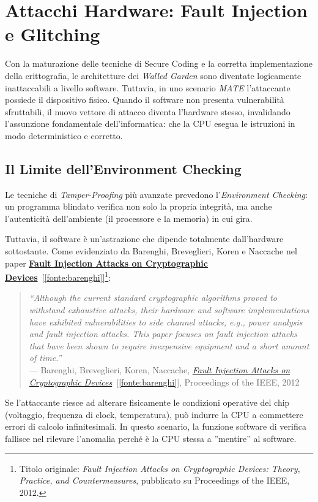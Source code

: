 \section{Attacchi Hardware: Fault Injection e Glitching}

Con la maturazione delle tecniche di Secure Coding e la corretta implementazione della crittografia, le architetture dei \textit{Walled Garden} sono diventate logicamente inattaccabili a livello software. Tuttavia, in uno scenario \textit{MATE} l'attaccante possiede il dispositivo fisico. Quando il software non presenta vulnerabilità sfruttabili, il nuovo vettore di attacco diventa l'hardware stesso, invalidando l'assunzione fondamentale dell'informatica: che la CPU esegua le istruzioni in modo deterministico e corretto.

\subsection{Il Limite dell'Environment Checking}

Le tecniche di \textit{Tamper-Proofing} più avanzate prevedono l'\textit{Environment Checking}: un programma blindato verifica non solo la propria integrità, ma anche l'autenticità dell'ambiente (il processore e la memoria) in cui gira.

Tuttavia, il software è un'astrazione che dipende totalmente dall'hardware sottostante. Come evidenziato da Barenghi, Breveglieri, Koren e Naccache nel paper \hyperref[fonte:barenghi]{\textbf{Fault Injection Attacks on Cryptographic Devices}}~[\ref{fonte:barenghi}]\footnote{Titolo originale: \textit{Fault Injection Attacks on Cryptographic Devices: Theory, Practice, and Countermeasures}, pubblicato su Proceedings of the IEEE, 2012.}:

\begin{quote}
    \textit{``Although the current standard cryptographic algorithms proved to withstand exhaustive attacks, their hardware and software implementations have exhibited vulnerabilities to side channel attacks, e.g., power analysis and fault injection attacks. This paper focuses on fault injection attacks that have been shown to require inexpensive equipment and a short amount of time.''}\\
    --- Barenghi, Breveglieri, Koren, Naccache, \hyperref[fonte:barenghi]{\textit{Fault Injection Attacks on Cryptographic Devices}}~[\ref{fonte:barenghi}], Proceedings of the IEEE, 2012
\end{quote}

Se l'attaccante riesce ad alterare fisicamente le condizioni operative del chip (voltaggio, frequenza di clock, temperatura), può indurre la CPU a commettere errori di calcolo infinitesimali. In questo scenario, la funzione software di verifica fallisce nel rilevare l'anomalia perché è la CPU stessa a ''mentire'' al software.

